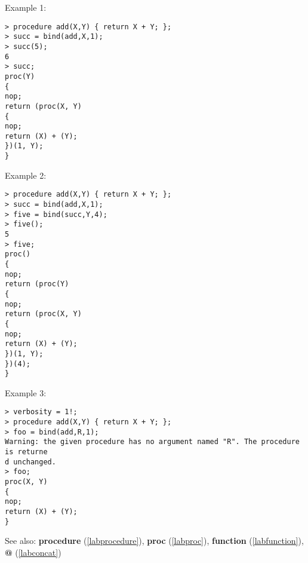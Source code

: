 \noindent Example 1: 
\begin{center}\begin{minipage}{15cm}\begin{Verbatim}[frame=single]
> procedure add(X,Y) { return X + Y; };
> succ = bind(add,X,1);
> succ(5);
6
> succ;
proc(Y)
{
nop;
return (proc(X, Y)
{
nop;
return (X) + (Y);
})(1, Y);
}
\end{Verbatim}
\end{minipage}\end{center}
\noindent Example 2: 
\begin{center}\begin{minipage}{15cm}\begin{Verbatim}[frame=single]
> procedure add(X,Y) { return X + Y; };
> succ = bind(add,X,1);
> five = bind(succ,Y,4);
> five();
5
> five;
proc()
{
nop;
return (proc(Y)
{
nop;
return (proc(X, Y)
{
nop;
return (X) + (Y);
})(1, Y);
})(4);
}
\end{Verbatim}
\end{minipage}\end{center}
\noindent Example 3: 
\begin{center}\begin{minipage}{15cm}\begin{Verbatim}[frame=single]
> verbosity = 1!;
> procedure add(X,Y) { return X + Y; };
> foo = bind(add,R,1);
Warning: the given procedure has no argument named "R". The procedure is returne
d unchanged.
> foo;
proc(X, Y)
{
nop;
return (X) + (Y);
}
\end{Verbatim}
\end{minipage}\end{center}
See also: \textbf{procedure} (\ref{labprocedure}), \textbf{proc} (\ref{labproc}), \textbf{function} (\ref{labfunction}), \textbf{@} (\ref{labconcat})
